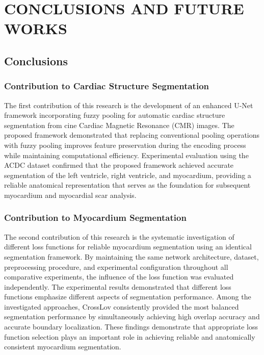 \chapter{CONCLUSIONS AND FUTURE WORKS}
\label{chap:7}

\section{Conclusions}
\label{sec:ch7-conclusions}

\subsection{Contribution to Cardiac Structure Segmentation}

The first contribution of this research is the development of an enhanced U-Net framework incorporating fuzzy pooling for automatic cardiac structure segmentation from cine Cardiac Magnetic Resonance (CMR) images. The proposed framework demonstrated that replacing conventional pooling operations with fuzzy pooling improves feature preservation during the encoding process while maintaining computational efficiency. Experimental evaluation using the ACDC dataset confirmed that the proposed framework achieved accurate segmentation of the left ventricle, right ventricle, and myocardium, providing a reliable anatomical representation that serves as the foundation for subsequent myocardium and myocardial scar analysis.

\subsection{Contribution to Myocardium Segmentation}

The second contribution of this research is the systematic investigation of different loss functions for reliable myocardium segmentation using an identical segmentation framework. By maintaining the same network architecture, dataset, preprocessing procedure, and experimental configuration throughout all comparative experiments, the influence of the loss function was evaluated independently. The experimental results demonstrated that different loss functions emphasize different aspects of segmentation performance. Among the investigated approaches, CrossLov consistently provided the most balanced segmentation performance by simultaneously achieving high overlap accuracy and accurate boundary localization. These findings demonstrate that appropriate loss function selection plays an important role in achieving reliable and anatomically consistent myocardium segmentation.

